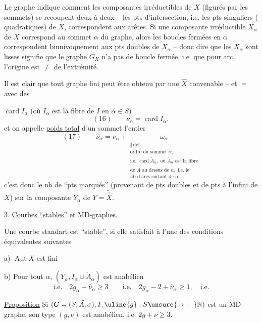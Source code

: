 Le graphe indique comment les composantes irréductibles de $X$ (figurés par les sommets) se recoupent deux à deux -- les pts d'intersection, i.e. les pts singuliers ( quadratiques) de $X$, correspondent aux arêtes. Si une composante irréductible $X_\alpha$ de $X$ correspond au sommet $\alpha$ du graphe, alors les boucles fermées en $\alpha$ correspondent biunivoquement aux pts doubles de $X_\alpha$ -- donc dire que les $X_\alpha$ sont lisses signifie que le graphe $G_X$ n'a pas de boucle fermée, i.e. que pour  arc, l'origine est $\neq$ de l'extrémité.

Il est clair que tout graphe fini peut être obtenu   par une $\widehat X$ convenable -- et $=$ avec des 

$\operatorname{card}I_\alpha$ (où $I_\alpha$ est la fibre de $I$ en $\alpha\in S$)
\[
(16)\qquad\nu_\alpha=\operatorname{card}I_\alpha,
\]
et on appelle \uline{poids total} d'un sommet l'entier
\[
(17)\qquad\widehat\nu_\alpha=\nu_\alpha+
\underset{\substack{\Vert\ \mathrm{déf}\\
\text{ordre du sommet }\alpha,\\
\text{i.e. }\operatorname{card}\widetilde A_\alpha,\text{ où }\widetilde A_\alpha\text{ est la fibre}\\
\text{de }\widetilde A\text{ au dessus de }\alpha,\text{ i.e. le}\\
\text{nb d'arcs sortant de }\alpha}}{\omega_\alpha}
\]
c'est donc le nb de ``pts marqués'' (provenant de pts doubles et de pts à l'infini de $X$) sur la composante $Y_\alpha$ de $Y=\widetilde{\widehat X}$.

3. \uline{Courbes ``stables''} \uline{et} MD-\uline{graphes.}

Une courbe standart  est ``stable'', si elle satisfait à l'une des conditions équivalentes suivantes

a) $\operatorname{Aut}X$ est fini

b) Pour tout $\alpha$, $(Y_\alpha,I_\alpha\cup\widetilde A_\alpha)$ est anabélien
\[
\text{i.e.}\quad 2g_\alpha+\widehat\nu_\alpha\geq3\qquad
\text{i.e.}\quad 2g_\alpha-2+\widehat\nu_\alpha\geq1,\quad\text{i.e.}
\]

\uline{Proposition} Si $(G=(S,\widetilde A,\sigma),I,\uline{g}:S\unsure{\to|-}\mathbb N)$ est un MD-graphe, son type $(g,\nu)$ est anabélien, i.e. $2g+\nu\geq3$.

